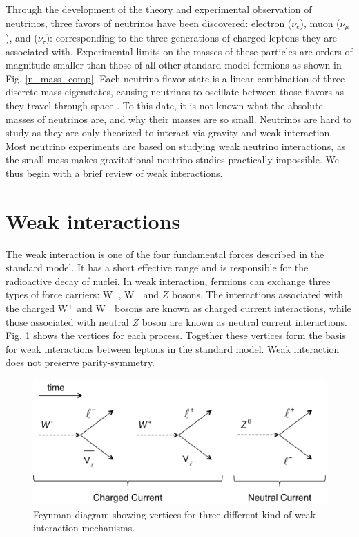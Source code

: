 Through the development of the theory and experimental observation of neutrinos, three favors of neutrinos have been discovered: electron ($\nu_e$), muon ($\nu_{\mu}$), and ($\nu_{\tau}$): corresponding to the three generations of charged leptons they are associated with. Experimental limits on the masses of these particles are orders of magnitude smaller than those of all other standard model fermions as shown in Fig. \ref{n_mass_comp}. Each neutrino flavor state is a linear combination of three discrete mass eigenstates, causing neutrinos to oscillate between those flavors as they travel through space \cite{Super_Kamiokande_1998kpq}. To this date, it is not known what the absolute masses of neutrinos are, and why their masses are so small. Neutrinos are hard to study as they are only theorized to interact via gravity and weak interaction. Most neutrino experiments are based on studying weak neutrino interactions, as the small mass makes gravitational neutrino studies practically impossible. We thus begin with a brief review of weak interactions.


\section{Weak interactions}
The weak interaction is one of the four fundamental forces described in the standard model. It has a short effective range and is responsible for the radioactive decay of nuclei. In weak interaction, fermions can exchange three types of force carriers: W$^+$, W$^-$ and $Z$ bosons. The interactions associated with the charged W$^+$ and W$^-$ bosons are known as charged current interactions, while those associated with neutral $Z$ boson are known as neutral current interactions. Fig. \ref{fig:weak_current} shows the vertices for each process. Together these vertices form the basis for weak interactions between leptons in the standard model. Weak interaction does not preserve parity-symmetry.\cite{wu_experiment}

\begin{figure}
\centering
\includegraphics[width=0.8\linewidth]{ch1/figs/weak_current.png}
\caption{Feynman diagram showing vertices for three different kind of weak interaction mechanisms. \cite{ParticleDataGroup:2014cgo}}
\label{fig:weak_current}
\end{figure}


